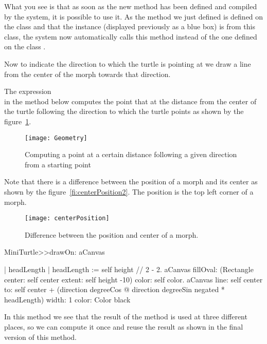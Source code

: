 What you see is that as soon as the new method has been defined and
compiled by the system, it is possible to use it. As the method we
just defined is defined on the class \mtc and that the instance
(displayed previously as a blue box) is from this class, the system
now automatically calls this method instead of the one defined on the
class .

Now to indicate the direction to which the turtle is pointing at we
draw a line from the center of the morph towards that direction.

The expression  \\  in the method below computes the
point that at the distance  from the center of the
turtle following the direction to which the turtle points as shown by the figure~\ref{fig:geometry}.

\begin{figure}
\begin{center}
\texttt{[image: Geometry]}
\caption{Computing a point at a certain distance following a given direction from a starting point\label{fig:geometry}}
\end{center}
\end{figure}


Note that there is a difference between the position of a morph and its center as shown by the figure~\ref{fi:centerPosition2}. The position is the top left corner of a morph. 

\begin{figure}
\begin{center}
\texttt{[image: centerPosition]}
\caption{Difference between the position and center of a morph.\label{fig: centerPosition2}}
\end{center}
\end{figure}


\begin{method}
MiniTurtle>>drawOn: aCanvas

   | headLength |
   headLength := self height // 2 - 2.
   aCanvas 
      fillOval: (Rectangle center: self center 
                           extent: self height -10)
      color: self color.
   aCanvas
      line: self center
      to: self center 
            + (direction degreeCos @ direction degreeSin negated 
                 * headLength)
      width: 1
      color: Color black
\end{method}

In this method we see that the result of the method  is
used at three different places, so we can compute it once and reuse
the result as shown in the final version of this method.


